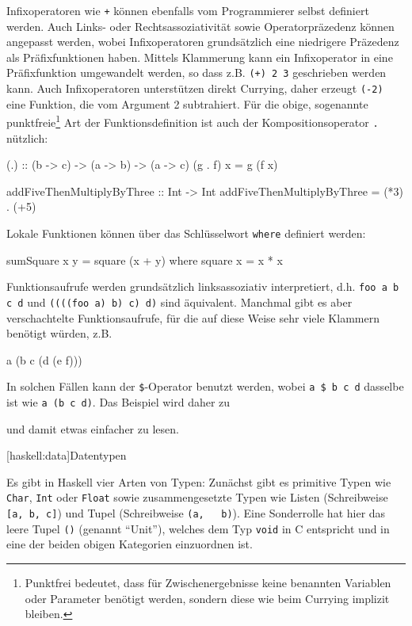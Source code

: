 \documentclass[12pt, a4paper, bibgerm]{scrbook}
\newenvironment{DIFnomarkup}{}{}
\newcommand\icode[1]{\lstinline?#1?}
\newcommand\lsection{}
\begin{document}
Infixoperatoren wie \icode{+} können ebenfalls vom Programmierer selbst
definiert werden. Auch Links- oder Rechtsassoziativität sowie
Operatorpräzedenz können angepasst werden, wobei Infixoperatoren
grundsätzlich eine niedrigere Präzedenz als Präfixfunktionen
haben. Mittels Klammerung kann ein Infixoperator in eine Präfixfunktion
umgewandelt werden, so dass z.B. \icode{(+) 2 3} geschrieben werden
kann. Auch Infixoperatoren unterstützen direkt Currying, daher erzeugt
\icode{(-2)} eine Funktion, die vom Argument 2 subtrahiert. Für die
obige, sogenannte punktfreie\footnote{Punktfrei bedeutet, dass für
  Zwischenergebnisse keine benannten Variablen oder Parameter benötigt
  werden, sondern diese wie beim Currying implizit bleiben.} Art der
Funktionsdefinition ist auch der Kompositionsoperator \icode{.}
nützlich:
\begin{DIFnomarkup}\begin{code}
(.) :: (b -> c) -> (a -> b) -> (a -> c)
(g . f) x = g (f x)

addFiveThenMultiplyByThree :: Int -> Int
addFiveThenMultiplyByThree = (*3) . (+5)
\end{code}\end{DIFnomarkup}

Lokale Funktionen können über das Schlüsselwort \icode{where} definiert
werden:
\begin{DIFnomarkup}\begin{code}
sumSquare x y = square (x + y)
  where
    square x = x * x
\end{code}\end{DIFnomarkup}

Funktionsaufrufe werden grundsätzlich linksassoziativ interpretiert,
d.h. \icode{foo a b c d} und \icode{((((foo a) b) c) d)} sind
äquivalent. Manchmal gibt es aber verschachtelte Funktionsaufrufe, für
die auf diese Weise sehr viele Klammern benötigt würden, z.B. 
\begin{code}
a (b c (d (e f)))
\end{code}
In solchen Fällen kann der \icode{$}-Operator benutzt werden, wobei
\icode{a $ b c d} dasselbe ist wie \icode{a (b c d)}. Das Beispiel wird
daher zu
und damit etwas einfacher zu lesen.

\lsection[haskell:data]{Datentypen}

Es gibt in Haskell vier Arten von Typen: Zunächst gibt es primitive
Typen wie \icode{Char}, \icode{Int} oder \icode{Float} sowie
zusammengesetzte Typen wie Listen (Schreibweise \icode{[a, b, c]}) und Tupel (Schreibweise \icode{(a,
  b)}). Eine Sonderrolle hat hier das leere Tupel \icode{()} (genannt
"`Unit"'), welches dem Typ \icode{void} in C entspricht und in
eine der beiden obigen Kategorien einzuordnen ist.
\end{document}
